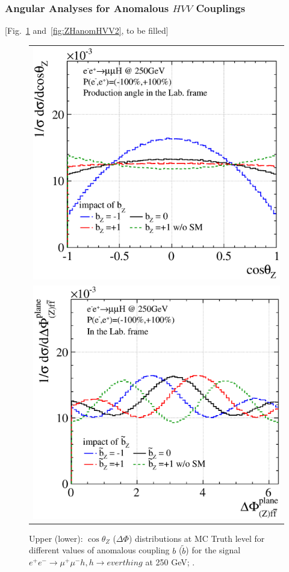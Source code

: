 \subsubsection{Angular Analyses for Anomalous $HVV$ Couplings}
[Fig.~\ref{fig:ZHanomHVV1} and~\ref{fig:ZHanomHVV2}, to be filled]
\begin{figure}
\begin{tabular}[c]{c}
\includegraphics[width=0.85\hsize]{chapters/figures/ZH_anomHVV250_b.eps} \\
\includegraphics[width=0.85\hsize]{chapters/figures/ZH_anomHVV250_bt.eps} 
\end{tabular}
  \caption{Upper (lower): $\cos\theta_Z$ ($\Delta\Phi$) distributions at MC Truth level for different 
  values of anomalous coupling $b$ ($\tilde{b}$) 
  for the signal $e^+e^-\to \mu^+\mu^- h, h\to everthing$ at 250 GeV;
  \cite{anomHVV}.}
  \label{fig:ZHanomHVV1}
\end{figure}


